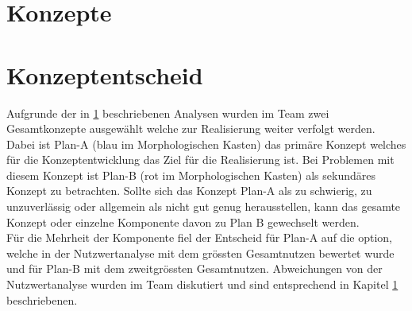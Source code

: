 \documentclass[11pt]{scrartcl}
\begin{document}
        \section{Konzepte} \label{konzepte}
        
        \clearpage


        \section{Konzeptentscheid}
        Aufgrunde der in \ref{konzepte} beschriebenen Analysen wurden im Team zwei Gesamtkonzepte ausgewählt welche zur Realisierung weiter verfolgt werden. Dabei ist Plan-A (blau im Morphologischen Kasten) das primäre Konzept welches für die Konzeptentwicklung das Ziel für die Realisierung ist. Bei Problemen mit diesem Konzept ist Plan-B (rot im Morphologischen Kasten) als sekundäres Konzept zu betrachten. Sollte sich das Konzept Plan-A als zu schwierig, zu unzuverlässig oder allgemein als nicht gut genug herausstellen, kann das gesamte Konzept oder einzelne Komponente davon zu Plan B gewechselt werden.\\
        Für die Mehrheit der Komponente fiel der Entscheid für Plan-A auf die option, welche in der Nutzwertanalyse mit dem grössten Gesamtnutzen bewertet wurde und für Plan-B mit dem zweitgrössten Gesamtnutzen. Abweichungen von der Nutzwertanalyse wurden im Team diskutiert und sind entsprechend in Kapitel \ref{konzepte} beschriebenen.  

    
\end{document}
